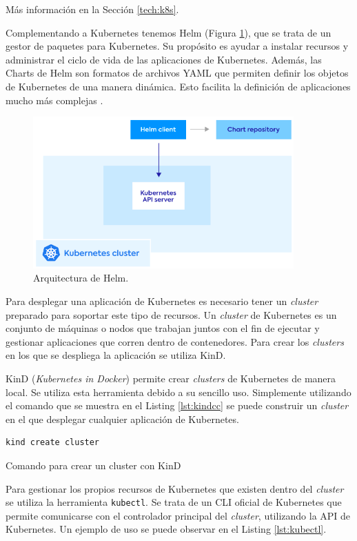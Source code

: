 Más información en la Sección \ref{tech:k8s}.

Complementando a Kubernetes tenemos Helm (Figura \ref{fig:helm}), que se trata de un gestor de paquetes para Kubernetes. Su propósito es ayudar a instalar recursos y administrar el ciclo de vida de las aplicaciones de Kubernetes. Además, las Charts de Helm son formatos de archivos YAML que permiten definir los objetos de Kubernetes de una manera dinámica. Esto facilita la definición de aplicaciones mucho más complejas .

\begin{figure}
  \centerline{\includegraphics[width=10cm]{figuras/helm}}
  \caption{Arquitectura de Helm\cite{img:helm}.}
  \label{fig:helm}
\end{figure}

Para desplegar una aplicación de Kubernetes es necesario tener un \textit{cluster} preparado para soportar este tipo de recursos. Un \textit{cluster} de Kubernetes es un conjunto de máquinas o nodos que trabajan juntos con el fin de ejecutar y gestionar aplicaciones que corren dentro de contenedores. Para crear los \textit{clusters} en los que se despliega la aplicación se utiliza KinD\cite{kind}.

KinD (\textit{Kubernetes in Docker}) permite crear \textit{clusters} de Kubernetes de manera local. Se utiliza esta herramienta debido a su sencillo uso. Simplemente utilizando el comando que se muestra en el Listing \ref{lst:kindcc} se puede construir un \textit{cluster} en el que desplegar cualquier aplicación de Kubernetes.

\begin{listing}[!ht]
  \begin{verbatim}
kind create cluster
  \end{verbatim}
  \caption{Comando para crear un cluster con KinD}
  \label{lst:kindcc}
\end{listing}

Para gestionar los propios recursos de Kubernetes que existen dentro del \textit{cluster} se utiliza la herramienta \texttt{kubectl}\cite{kubectl}. Se trata de un CLI oficial de Kubernetes que permite comunicarse con el controlador principal del \textit{cluster}, utilizando la API de Kubernetes. Un ejemplo de uso se puede observar en el Listing \ref{lst:kubectl}.

